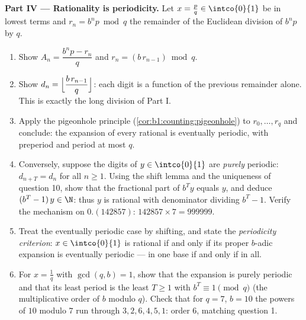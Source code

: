 \begin{problem}
\medskip
\noindent\textbf{Part IV --- Rationality is periodicity.} Let $x
= \frac pq \in \intco{0}{1}$ be in lowest terms and $r_n = b^n p
\bmod q$ the remainder of the Euclidean division of $b^n p$ by
$q$.
\begin{enumerate}[resume]
  \item Show $A_n = \dfrac{b^n p - r_n}{q}$ and $r_n =
        (b\,r_{n-1}) \bmod q$.
  \item Show $d_n = \Bigl\lfloor \dfrac{b\,r_{n-1}}{q}
        \Bigr\rfloor$: each digit is a function of the previous
        remainder alone. This is exactly the long division of
        Part I.
  \item Apply the pigeonhole principle
        (\cref{cor:b1:counting:pigeonhole}) to $r_0, \dots, r_q$
        and conclude: the expansion of every rational is
        eventually periodic, with preperiod and period at most
        $q$.
  \item Conversely, suppose the digits of $y \in \intco{0}{1}$
        are \emph{purely} periodic: $d_{n+T} = d_n$ for all $n
        \geq 1$. Using the shift lemma and the uniqueness of
        question 10, show that the fractional part of $b^T y$
        equals $y$, and deduce $(b^T - 1)\,y \in \N$: thus $y$ is
        rational with denominator dividing $b^T - 1$. Verify the
        mechanism on $0.(142857)$: $142857 \times 7 = 999999$.
  \item Treat the eventually periodic case by shifting, and state
        the \emph{periodicity criterion}: $x \in \intco{0}{1}$ is
        rational if and only if its proper $b$-adic expansion is
        eventually periodic --- in one base if and only if in
        all.
  \item For $x = \frac 1q$ with $\gcd(q, b) = 1$, show that the
        expansion is purely periodic and that its least period is
        the least $T \geq 1$ with $b^T \equiv 1 \pmod q$ (the
        multiplicative order of $b$ modulo $q$). Check that for
        $q = 7$, $b = 10$ the powers of $10$ modulo $7$ run
        through $3, 2, 6, 4, 5, 1$: order $6$, matching question
        1.
\end{enumerate}


\end{problem}
